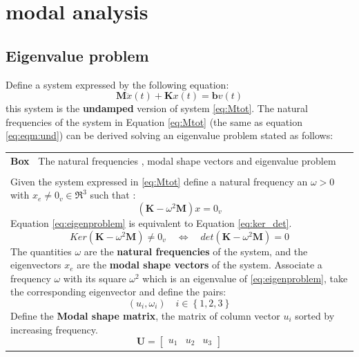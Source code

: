 \documentclass[twosided,a4paper]{article}           %
\newcounter{box}
\newenvironment{scatola}[1]
{\refstepcounter{box}
\begin{center}
		\begin{tabular}{|p{\linewidth}|}
			\hline \textbf{Box~\thebox} #1  \\
		}
		{ 
			 \\ \hline
		\end{tabular} 
	\end{center}
 }
\begin{document}
\section{modal analysis}
\subsection{Eigenvalue problem}
\label{sec:eigenvalueproblem}
Define a system expressed by the following equation:
\begin{equation}
\bm M \ddot{x}(t) + \bm K x(t) = \bm bv(t)
\label{eq:eqm:und}
\end{equation} 
this system is the \textbf{undamped} version of system \eqref{eq:Mtot}.
The natural frequencies of the system in Equation \eqref{eq:Mtot} (the same as equation \ref{eq:eqm:und}) can be derived solving an eigenvalue problem stated as follows:
\begin{scatola}{The natural frequencies , modal shape vectors and eigenvalue problem}
	\label{box:eig_prob}
	 \\
			Given the system expressed in \eqref{eq:Mtot} define a natural frequency an $\omega > 0$ with $x_e \neq 0_v \in \Re^3 $ such that :
		\begin{equation}
		\label{eq:eigenproblem}
			\left( \bm{K} -\omega^{2}\bm{M} \right )x = 0_v 
		\end{equation}
		Equation \eqref{eq:eigenproblem} is equivalent to Equation \eqref{eq:ker_det}.
		\begin{equation}
		\label{eq:ker_det}
			Ker\left( \bm{K} -\omega^{2}\bm{M} \right ) \neq 0_v \quad \Leftrightarrow  \quad det\left( \bm{K} -\omega^{2}\bm{M} \right ) = 0
		\end{equation}
	The quantities $\omega$ are the \textbf{natural frequencies} of the system, and the eigenvectors $x_e$ are the \textbf{modal shape vectors} of the system. Associate a frequency $\omega$ with its square $\omega^2$ which is an eigenvalue of \eqref{eq:eigenproblem}, take the corresponding eigenvector and define the pairs:
	\begin{equation}
		(u_i,\omega_i) \quad i \in \left \lbrace 1,2,3\right \rbrace
	\end{equation}
	Define the \textbf{Modal shape matrix}, the matrix of column vector $u_i$ sorted by increasing frequency.
	\begin{equation}
		\bm{U} = \left [\begin{array}{ccc}
		u_1 & u_2 & u_3
		\end{array} \right ]
	\end{equation}
\end{scatola}
\end{document}
